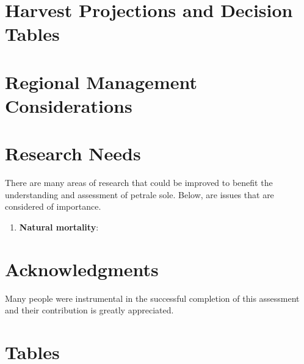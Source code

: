 \documentclass[12pt,]{article}
\begin{document}
\section{Harvest Projections and Decision
Tables}\label{harvest-projections-and-decision-tables}

\section{Regional Management
Considerations}\label{regional-management-considerations}

\section{Research Needs}\label{research-needs}

There are many areas of research that could be improved to benefit the
understanding and assessment of petrale sole. Below, are issues that are
considered of importance.

\begin{enumerate}

\item \textbf{Natural mortality}: 



\end{enumerate}

\section{Acknowledgments}\label{acknowledgments}

Many people were instrumental in the successful completion of this
assessment and their contribution is greatly appreciated.

\newpage

\FloatBarrier

\section{Tables}\label{tables}
\end{document}
